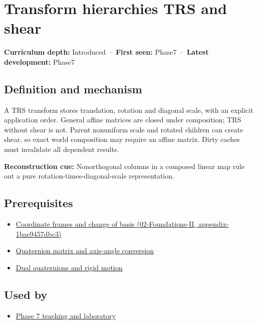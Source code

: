 \hypertarget{appendix-292c061cd47c}{}
\section{Transform hierarchies TRS and shear}\label{appendix-292c061cd47c-transform-hierarchies-trs-and-shear}

\textbf{Curriculum depth:} Introduced · \textbf{First seen:} Phase7 · \textbf{Latest development:} Phase7

\subsection{Definition and mechanism}\label{appendix-292c061cd47c-definition-and-mechanism}

A TRS transform stores translation, rotation and diagonal scale, with an explicit application order. General affine matrices are closed under composition; TRS without shear is not. Parent nonuniform scale and rotated children can create shear, so exact world composition may require an affine matrix. Dirty caches must invalidate all dependent results.

\textbf{Reconstruction cue:} Nonorthogonal columns in a composed linear map rule out a pure rotation-times-diagonal-scale representation.

\subsection{Prerequisites}\label{appendix-292c061cd47c-prerequisites}

\begin{itemize}
\tightlist
\item
  \href{../02-Foundations-II/main.pdf\#nameddest=appendix-1bae9457dbc3}{Coordinate frames and change of basis (02-Foundations-II, appendix-1bae9457dbc3)}
\item
  \hyperref[appendix-26d8da71f6c4]{Quaternion matrix and axis-angle conversion}
\item
  \hyperref[appendix-d1ea57347893]{Dual quaternions and rigid motion}
\end{itemize}

\subsection{Used by}\label{appendix-292c061cd47c-used-by}

\begin{itemize}
\tightlist
\item
  \hyperref[01-foundations-i-ch018-keep-the-promises-visible-while-moving-between-representations]{Phase 7 teaching and laboratory}
\end{itemize}

